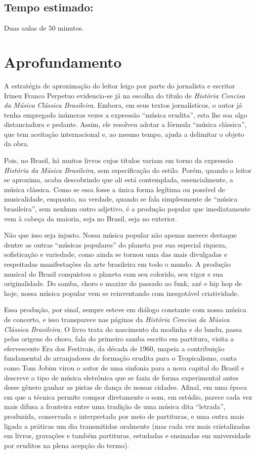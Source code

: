 \documentclass[11pt]{extarticle}
\begin{document}
\subsection{Tempo estimado:} Duas aulas de 50 minutos.


\section{Aprofundamento}

A estratégia de aproximação do leitor leigo por parte do jornalista e
escritor Irineu Franco Perpetuo evidencia-se já na escolha do título de
\emph{História Concisa da Música Clássica Brasileira}. Embora, em seus
textos jornalísticos, o autor já tenha empregado inúmeras vezes a
expressão ``música erudita'', esta lhe soa algo distanciadora e pedante.
Assim, ele resolveu adotar a fórmula ``música clássica'', que tem
aceitação internacional e, ao mesmo tempo, ajuda a delimitar o objeto da
obra.

Pois, no Brasil, há muitos livros cujos títulos variam em torno da
expressão \emph{História da Música Brasileira,} sem especificação do
estilo. Porém, quando o leitor se aproxima, acaba descobrindo que ali
está contemplada, essencialmente, a música clássica. Como se essa fosse
a única forma legítima ou possível de musicalidade, enquanto, na
verdade, quando se fala simplesmente de ``música brasileira'', sem
nenhum outro adjetivo, é a produção popular que imediatamente vem à
cabeça da maioria, seja no Brasil, seja no exterior.

Não que isso seja injusto. Nossa música popular não apenas merece
destaque dentre as outras ``músicas populares'' do planeta por sua
especial riqueza, sofisticação e variedade, como ainda se tornou uma das
mais divulgadas e respeitadas manifestações da arte brasileira em todo o
mundo. A produção musical do Brasil conquistou o planeta com seu
colorido, seu vigor e sua originalidade. Do samba, choro e maxixe do
passado ao funk, axé e hip hop de hoje, nossa música popular vem se
reinventando com inesgotável criatividade.

Essa produção, por sinal, sempre esteve em diálogo constante com nossa
música de concerto, e isso transparece nas páginas da \emph{História
Concisa da Música Clássica Brasileira.} O livro trata do nascimento da
modinha e do lundu, passa pelas origens do choro, fala do primeiro samba
escrito em partitura, visita a efervescente Era dos Festivais, da década
de 1960, mapeia a contribuição fundamental de arranjadores de formação
erudita para o Tropicalismo, conta como Tom Jobim virou o autor de uma
sinfonia para a nova capital do Brasil e descreve o tipo de música
eletrônica que se fazia de forma experimental antes desse gênero ganhar
as pistas de dança de nossas cidades. Afinal, em uma época em que a
técnica permite compor diretamente o som, em estúdio, parece cada vez
mais difusa a fronteira entre uma tradição de uma música dita
``letrada'', produzida, conservada e interpretada por meio de
partituras, e uma outra mais ligada a práticas um dia transmitidas
oralmente (mas cada vez mais cristalizadas em livros, gravações e também
partituras, estudadas e ensinadas em universidade por eruditos na plena
acepção do termo).
\end{document}
